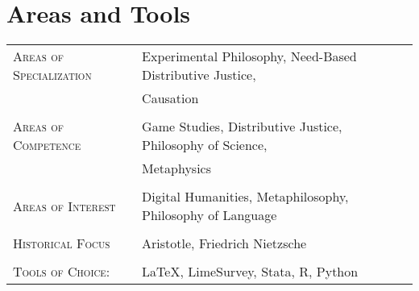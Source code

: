 \documentclass[a4paper,10pt]{article}
\begin{document}
\section{Areas and Tools}
\begin{longtable}{p{4cm}p{11.5cm}}
   \textsc{Areas of Specialization}   & Experimental Philosophy, Need-Based Distributive Justice,\\
                                      & Causation\\
                                      & \\
   \textsc{Areas of Competence}       & Game Studies, Distributive Justice, Philosophy of Science,\\
                                      & Metaphysics\\
                                      & \\
   \textsc{Areas of Interest}         & Digital Humanities, Metaphilosophy, Philosophy of Language\\
                                      & \\
   \textsc{Historical Focus}          & Aristotle, Friedrich Nietzsche\\
                                      & \\
   \textsc{Tools of Choice:}          & \LaTeX, LimeSurvey, Stata, R, Python
\end{longtable}


\clearpage
\end{document}
